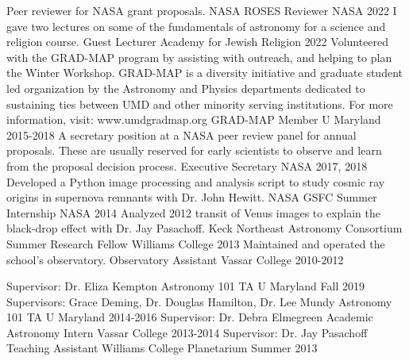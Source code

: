 \documentclass[]{awesome-cv}
\begin{document}
\begin{cventries}
	\cventry
	{Peer reviewer for NASA grant proposals.}
	{NASA ROSES Reviewer}
	{NASA}
	{2022}
	{}
	\cventry
	{I gave two lectures on some of the fundamentals of astronomy for a science and religion course.}
	{Guest Lecturer}
	{Academy for Jewish Religion }
	{2022}
	{}
	\cventry
	{Volunteered with the GRAD-MAP program by assisting with outreach, and helping to plan the Winter Workshop. GRAD-MAP is a diversity initiative and graduate student led organization by the Astronomy and Physics departments dedicated to sustaining ties between UMD and other minority serving institutions. For more information, visit: www.umdgradmap.org}
	{GRAD-MAP Member}
	{U Maryland}
	{2015-2018}
	{}
	\cventry
	{A secretary position at a NASA peer review panel for annual proposals. These are usually reserved for early scientists to observe and learn from the proposal decision process.}
	{Executive Secretary}
	{NASA}
	{2017, 2018}
	{}
	\cventry
	{Developed a Python image processing and analysis script to study cosmic ray origins in supernova remnants with Dr. John Hewitt.}
	{NASA GSFC Summer Internship}
	{NASA}
	{2014}
	{}
	\cventry
	{Analyzed 2012 transit of Venus images to explain the black-drop effect with Dr. Jay Pasachoff.}
	{Keck Northeast Astronomy Consortium Summer Research Fellow }
	{Williams College}
	{2013}
	{}
	\cventry
	{Maintained and operated the school's observatory.}
	{Observatory Assistant}
	{Vassar College}
	{2010-2012}
	{}
	
	\vspace{-7mm}
\end{cventries}

\begin{cventries}
	\cventry
	{Supervisor: Dr. Eliza Kempton}
	{Astronomy 101 TA}
	{U Maryland}
	{Fall 2019}
	{}
	\cventry
	{Supervisors: Grace Deming, Dr. Douglas Hamilton, Dr. Lee Mundy}
	{Astronomy 101 TA}
	{U Maryland}
	{2014-2016}
	{}
	\cventry
	{Supervisor: Dr. Debra Elmegreen}
	{Academic Astronomy Intern}
	{Vassar College}
	{2013-2014}
	{}
	\cventry
	{Supervisor: Dr. Jay Pasachoff}
	{Teaching Assistant}
	{Williams College Planetarium}
	{Summer 2013}
	{}
\end{cventries}
\end{document}
